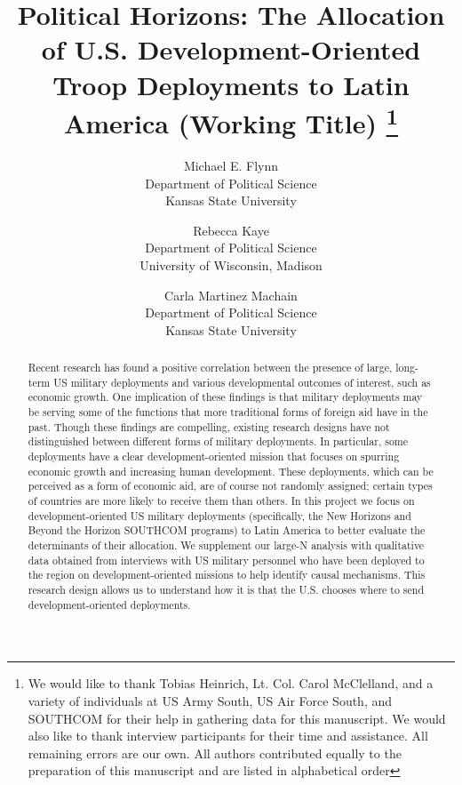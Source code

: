 \documentclass[12pt]{article}
\begin{document}
\title{Political Horizons: The Allocation of U.S. Development-Oriented Troop Deployments to Latin America (Working Title) \thanks{We would like to thank Tobias Heinrich, Lt. Col. Carol McClelland, and a variety of individuals at US Army South, US Air Force South, and SOUTHCOM for their help in gathering data for this manuscript. We would also like to thank interview participants for their time and assistance. All remaining errors are our own. All authors contributed equally to the preparation of this manuscript and are listed in alphabetical order}}
\author{Michael E. Flynn \\
Department of Political Science  \\
Kansas State University
\and
Rebecca Kaye \\
Department of Political Science \\
University of Wisconsin, Madison
\and
Carla Martinez Machain \\
Department of Political Science \\
Kansas State University
}
\date{}

\maketitle


\begin{abstract}
\noindent  Recent research has found a positive correlation between the presence of large, long-term US military deployments and various developmental outcomes of interest, such as economic growth. One implication of these findings is that military deployments may be serving some of the functions that more traditional forms of foreign aid have in the past.  Though these findings are compelling, existing research designs have not distinguished between different forms of military deployments. In particular, some deployments have a clear development-oriented mission that focuses on spurring economic growth and increasing human development.  These deployments, which can be perceived as a form of economic aid, are of course not randomly assigned; certain types of countries are more likely to receive them than others. In this project we focus on development-oriented US military deployments (specifically, the New Horizons and Beyond the Horizon SOUTHCOM programs) to Latin America to better evaluate the determinants of their allocation. We supplement our large-N analysis with qualitative data obtained from interviews with US military personnel who have been deployed to the region on development-oriented missions to help identify causal mechanisms. This research design allows us to understand how it is that the U.S. chooses where to send development-oriented deployments. 
\end{abstract}
\vfill
\thispagestyle{empty}
\clearpage
\end{document}
